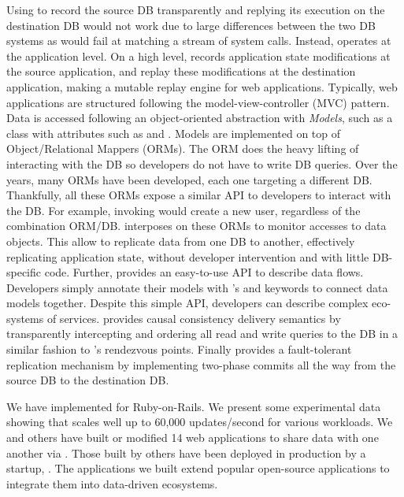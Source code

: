 Using \dora to record the source DB transparently and replying its execution on
the destination DB would not work due to large differences between the two DB systems
as \dora would fail at matching a stream of system calls.
Instead, \synapse operates at the application level.
On a high level, \synapse records application state modifications at the source
application, and replay these modifications at the destination application,
making \synapse a mutable replay engine for web applications.
Typically, web applications are structured following
the model-view-controller (MVC) pattern. Data is accessed following an object-oriented
abstraction with {\em Models}, such as a  class with attributes such
as  and . Models are implemented on top of
Object/Relational Mappers (ORMs).
The ORM does the heavy lifting of interacting with the DB so developers
do not have to write DB queries. Over the years, many ORMs have been developed,
each one targeting a different DB. Thankfully, all these ORMs expose a similar API
to developers to interact with the DB. For example, invoking
 would create a new user, regardless of the combination
ORM/DB.  \synapse interposes on these ORMs to monitor accesses to data objects.
This allow \synapse to replicate data from
one DB to another, effectively replicating application state,
without developer intervention and with little DB-specific code.
Further, \synapse provides an easy-to-use API to describe data flows. Developers simply
annotate their models with \synapse's  and 
keywords to connect data models together.
Despite this simple API, developers can describe complex eco-systems
of services. \synapse provides causal consistency delivery semantics by
transparently intercepting and ordering all read and write queries to the DB in
a similar fashion to \scribe's rendezvous points. Finally \synapse provides
a fault-tolerant replication mechanism by implementing two-phase commits all
the way from the source DB to the destination DB.

We have implemented \synapse for Ruby-on-Rails. We present some experimental
data showing that \synapse scales well up to 60,000 updates/second for various
workloads.  We and others have built or modified 14 web applications to share
data with one another via \synapse. Those built by others have been deployed in
production by a startup, \crowdtap.  The applications we built extend popular
open-source applications to integrate them into data-driven ecosystems.
